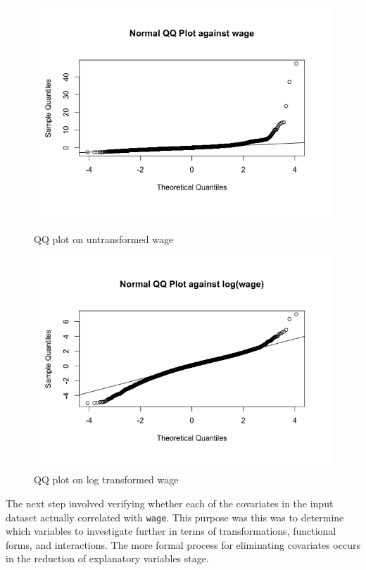 \documentclass{article}
\begin{document}
      \begin{figure}
        \centering
        \begin{minipage}{.45\textwidth}
          \centering
          \includegraphics[scale=0.35]{qqwage}
          \caption{QQ plot on untransformed wage}
          \label{fig:qqwage}
        \end{minipage}
        \begin{minipage}{.45\textwidth}
          \centering
          \includegraphics[scale=0.35]{qqlogwage}
          \caption{QQ plot on log transformed wage}
          \label{fig:qqlogwage}
        \end{minipage}
      \end{figure}

      The next step involved verifying whether each of the covariates in the input dataset
      actually correlated with \texttt{wage}. This purpose was this was to determine
      which variables to investigate further in terms of transformations, functional forms,
      and interactions. The more formal process for eliminating covariates occurs in the
      reduction of explanatory variables stage.
\end{document}
